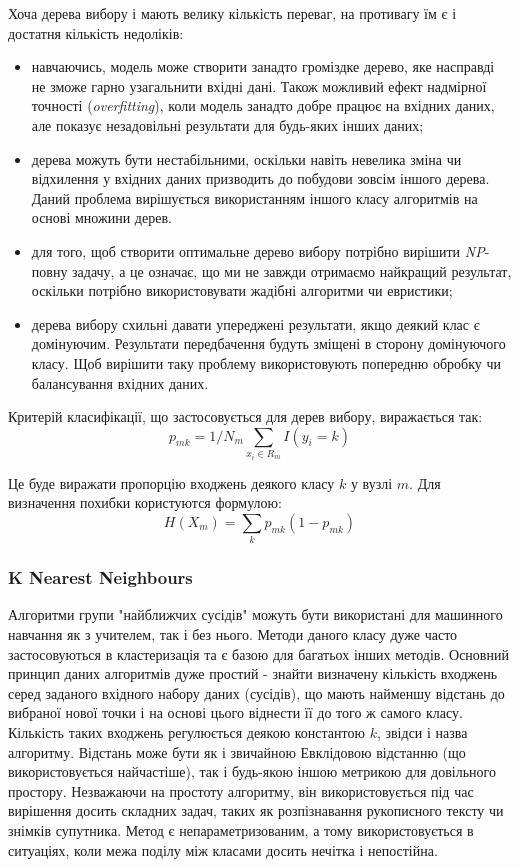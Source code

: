 Хоча дерева вибору і мають велику кількість переваг, на противагу їм є і достатня кількість недоліків:
\begin{itemize}  
	\item навчаючись, модель може створити занадто громіздке дерево, яке насправді не зможе гарно узагальнити вхідні дані. Також можливий ефект надмірної точності (\textit{overfitting}), коли модель занадто добре працює на вхідних даних, але показує незадовільні результати для будь-яких інших даних;
	\item дерева можуть бути нестабільними, оскільки навіть невелика зміна чи відхилення у вхідних даних призводить до побудови зовсім іншого дерева. Даний проблема вирішується використанням іншого класу алгоритмів на основі множини дерев.
	\item для того, щоб створити оптимальне дерево вибору потрібно вирішити \textit{NP}-повну задачу, а це означає, що ми не завжди отримаємо найкращий результат, оскільки потрібно використовувати жадібні алгоритми чи евристики;
	\item дерева вибору схильні давати упереджені результати, якщо деякий клас є домінуючим. Результати передбачення будуть зміщені в сторону домінуючого класу. Щоб вирішити таку проблему використовують попередню обробку чи балансування вхідних даних.
\end{itemize}

Критерій класифікації, що застосовується для дерев вибору, виражається так:
\begin{equation}
    \label{eq:decision_trees}
    p_{mk} = 1/N_{m}\sum_{x_{i} \in R_{m}}I(y_{i}=k)
\end{equation}

Це буде виражати пропорцію входжень деякого класу $k$ у вузлі $m$. Для визначення похибки користуются формулою:
\begin{equation}
    \label{eq:gini_norm}
    H(X_{m})=\sum_{k}p_{mk}(1-p_{mk})
\end{equation}

\subsubsection{K Nearest Neighbours}
Алгоритми групи "найближчих сусідів" можуть бути використані для машинного навчання як з учителем, так і без нього. Методи даного класу дуже часто застосовуються в кластеризація та є базою для багатьох інших методів. Основний принцип даних алгоритмів дуже простий - знайти визначену кількість входжень серед заданого вхідного набору даних (сусідів), що мають найменшу відстань до вибраної нової точки і на основі цього віднести її до того ж самого класу. Кількість таких входжень регулюється деякою константою $k$, звідси і назва алгоритму. Відстань може бути як і звичайною Евклідовою відстанню (що використовується найчастіше), так і будь-якою іншою метрикою для довільного простору. Незважаючи на простоту алгоритму, він використовується під час вирішення досить складних задач, таких як розпізнавання рукописного тексту чи знімків супутника. Метод є непараметризованим, а тому використовується в ситуаціях, коли межа поділу між класами досить нечітка і непостійна.

